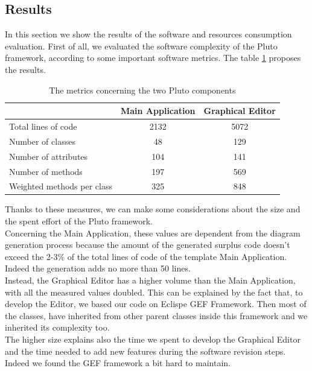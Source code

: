 \subsection{Results}
\label{metricsResult}

In this section we show the results of the software and resources consumption evaluation. First of all, we evaluated the software complexity of the Pluto framework, according to some important software metrics. The table \ref{table:metricsTable} proposes the results.

\begin{table}[htdp]
\centering
\begin{tabular}{|l|c|c|}
\hline
& Main Application & Graphical Editor \\
\hline
Total lines of code & 2132 & 5072 \\
\hline
Number of classes & 48 & 129 \\
\hline
Number of attributes & 104 & 141 \\
\hline
Number of methods & 197 & 569 \\
\hline
Weighted methods per class & 325 & 848 \\
\hline
\end{tabular}
\caption{The metrics concerning the two Pluto components}
\label{table:metricsTable}
\end{table}

Thanks to these measures, we can make some considerations about the size and the spent effort of the Pluto framework.
\\
Concerning the Main Application, these values are dependent from the diagram generation process because the amount of the generated surplus code doesn't exceed the 2-3\% of the total lines of code of the template Main Application. Indeed the generation adds no more than 50 lines.
\\
Instead, the Graphical Editor has a higher volume than the Main Application, with all the measured values doubled. 
This can be explained by the fact that, to develop the Editor, we based our code on Eclispe GEF Framework.
Then most of the classes, have inherited from other parent classes inside this framework and we inherited its complexity too.
\\
The higher size explains also the time we spent to develop the Graphical Editor and the time needed to add new features during the software revision steps. Indeed we found the GEF framework a bit hard to maintain.
\\

